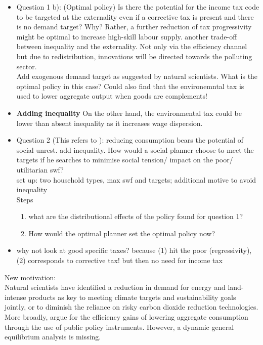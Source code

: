 \begin{itemize}
	\item Question 1 b): (Optimal policy) Is there the potential for the income tax code to be targeted at the externality even if a corrective tax is present and there is no demand target?
Why? Rather, a further reduction of tax progressivity might be optimal to increase high-skill labour supply. 
\ar another trade-off between inequality and the externality. Not only via the efficiency channel but due to redistribution, innovations will be directed towards the polluting sector. \\
Add exogenous demand target as suggested by natural scientists. What is the optimal policy in this case? Could also find that the environemntal tax is used to lower aggregate output when goods are complements! 

\item \textbf{Adding inequality}
On the other hand, the environmental tax could be lower than absent inequality as it increases wage dispersion. 

	\item Question 2 (This refers to \cite{Loebbing2019NationalChange}): reducing consumption bears the potential of social unrest. \ar add inequality. How would a social planner choose to meet the targets if he searches to minimise social tension/ impact on the poor/ utilitarian swf? 
	\\
	set up: two household types, max swf and targets; additional motive to avoid inequality
	\\
	Steps
	\begin{enumerate}
	\item what are the distributional effects of the policy found for question 1?
	\item How would the optimal planner set the optimal policy now? 
	\end{enumerate}
\item why not look at good specific taxes? \ar because (1) hit the poor (regressivity), (2) corresponds to corrective tax! \ar but then no need for income tax
\end{itemize}

New motivation: \\
Natural scientists have identified a reduction in demand for energy and land-intense products as key to meeting climate targets and sustainability goals jointly, or to diminish the reliance on risky carbon dioxide reduction technologies. More broadly, \cite{Arrow2004AreMuch} argue for the efficiency gains of lowering aggregate consumption through the use of public policy instruments. 
However, a dynamic general equilibrium analysis is missing. 

